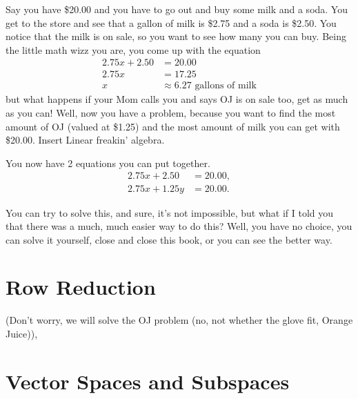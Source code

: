 Say you have \$20.00 and you have to go out and buy some milk and a soda. You get to the store and
see that a gallon of milk is \$2.75 and a soda is \$2.50. You notice that the milk is on sale, so you want to see how many you can buy. Being the little math wizz you are, you come up with the equation
\begin{equation}
    \begin{split}
    2.75x + 2.50 &= 20.00 \\
    2.75x &= 17.25 \\
    x & \approx 6.27 \text{ gallons of milk}
    \end{split}
\end{equation}
but what happens if your Mom calls you and says OJ is on sale too, get as much as you can!
Well, now you have a problem, because you want to find the most amount of OJ (valued at \$1.25) and the most amount
of milk you can get with \$20.00. Insert Linear freakin' algebra.

You now have 2 equations you can put together.
\begin{equation}
    \begin{split}
        2.75x + 2.50 &= 20.00, \\
        2.75x + 1.25y &= 20.00.
    \end{split}
\end{equation}

You can try to solve this, and sure, it's not impossible, but what if I told you that
there was a much, much easier way to do this? Well, you have no choice, you can solve it yourself,
close and close this book, or you can see the better way.

\section{Row Reduction}
(Don't worry, we will solve the OJ problem (no, not whether the glove fit, Orange Juice)),


\section{Vector Spaces and Subspaces}
